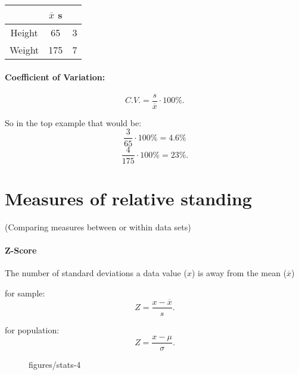 \begin{table}[htbp]
    \centering
    \begin{tabular}{c|c|c}
        \toprule
        & $\overline{x}$ s \\
        \midrule
        Height & 65 & 3 \\
        \midrule
        Weight & 175 & 7 \\
        \bottomrule
    \end{tabular}
\end{table}

\paragraph{Coefficient of Variation:}
\[ C.V. = \frac{s}{\overline{x}}\cdot 100\% .\] 

So in the top example that would be:
\[\frac{3}{65}\cdot 100\% = 4.6\% \]
\[\frac{4}{175}\cdot 100\% = 23\% .\] 

\section{Measures of relative standing}
(Comparing measures between or within data sets)

\paragraph{Z-Score} The number of standard deviations a data value ($x$) is away from the mean ($\overline{x}$)

for sample: \[
Z=\frac{x- \overline{x}}{s}
.\] 

for population: \[
    Z=\frac{x-\mu}{\sigma}
.\] 


\begin{figure}[ht]
    \centering
    \caption{figures/stats-4}
    \label{fig:stats-4}
\end{figure}


